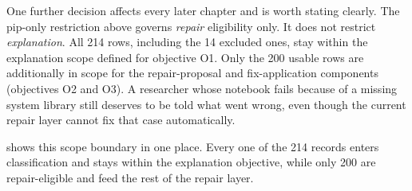 One further decision affects every later chapter and is worth stating
clearly. The pip-only restriction above governs \emph{repair} eligibility
only. It does not restrict \emph{explanation}. All 214 rows, including the
14 excluded ones, stay within the explanation scope defined for objective
O1. Only the 200 usable rows are additionally in scope for the
repair-proposal and fix-application components (objectives O2 and O3). A
researcher whose notebook fails because of a missing system library still
deserves to be told what went wrong, even though the current repair layer
cannot fix that case automatically.

 shows this scope boundary in one place. Every one of
the 214 records enters classification and stays within the explanation
objective, while only 200 are repair-eligible and feed the rest of the
repair layer.

